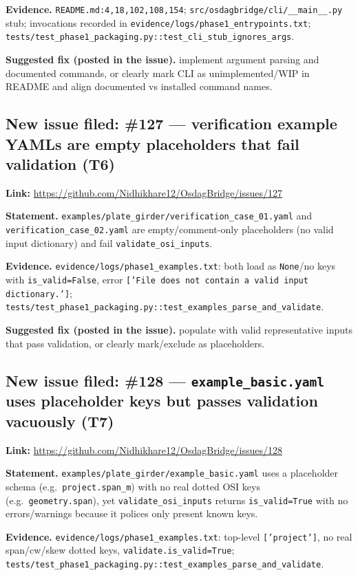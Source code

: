 \documentclass[11pt,a4paper]{article}
\begin{document}
\textbf{Evidence.} \texttt{README.md:4,18,102,108,154}; \texttt{src/osdagbridge/cli/\_\_main\_\_.py} stub; invocations recorded in \texttt{evidence/logs/phase1\_entrypoints.txt}; \texttt{tests/test\_phase1\_packaging.py::test\_cli\_stub\_ignores\_args}.

\textbf{Suggested fix (posted in the issue).} implement argument parsing and documented commands, or clearly mark CLI as unimplemented/WIP in README and align documented vs installed command names.

\subsection{New issue filed: \#127 --- verification example YAMLs are empty placeholders that fail validation (T6)}
\textbf{Link:} \url{https://github.com/Nidhikhare12/OsdagBridge/issues/127}

\textbf{Statement.} \texttt{examples/plate\_girder/verification\_case\_01.yaml} and \texttt{verification\_case\_02.yaml} are empty/comment-only placeholders (no valid input dictionary) and fail \texttt{validate\_osi\_inputs}.

\textbf{Evidence.} \texttt{evidence/logs/phase1\_examples.txt}: both load as \texttt{None}/no keys with \texttt{is\_valid=False}, error \texttt{['File does not contain a valid input dictionary.']}; \texttt{tests/test\_phase1\_packaging.py::test\_examples\_parse\_and\_validate}.

\textbf{Suggested fix (posted in the issue).} populate with valid representative inputs that pass validation, or clearly mark/exclude as placeholders.

\subsection{New issue filed: \#128 --- \texttt{example\_basic.yaml} uses placeholder keys but passes validation vacuously (T7)}
\textbf{Link:} \url{https://github.com/Nidhikhare12/OsdagBridge/issues/128}

\textbf{Statement.} \texttt{examples/plate\_girder/example\_basic.yaml} uses a placeholder schema (e.g.\ \texttt{project.span\_m}) with no real dotted OSI keys (e.g.\ \texttt{geometry.span}), yet \texttt{validate\_osi\_inputs} returns \texttt{is\_valid=True} with no errors/warnings because it polices only present known keys.

\textbf{Evidence.} \texttt{evidence/logs/phase1\_examples.txt}: top-level \texttt{['project']}, no real span/cw/skew dotted keys, \texttt{validate.is\_valid=True}; \texttt{tests/test\_phase1\_packaging.py::test\_examples\_parse\_and\_validate}.
\end{document}
